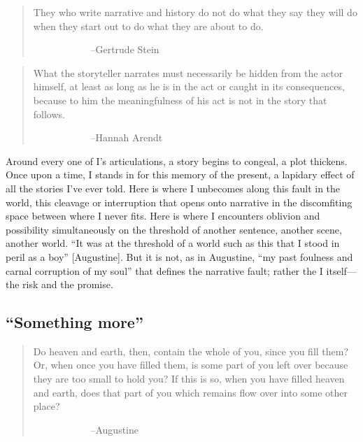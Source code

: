\documentclass[
]{memoir}
\begin{document}
\begin{quote}
They who write narrative and history do not do what they say they will
do when they start out to do what they are about to do.

~~~~~~~~~~ ~--Gertrude Stein
\end{quote}

\begin{quote}
What the storyteller narrates must necessarily be hidden from the actor
himself, at least as long as he is in the act or caught in its
consequences, because to him the meaningfulness of his act is not in the
story that follows.

~~~~~~~~~~ ~--Hannah Arendt
\end{quote}

Around every one of I's articulations, a story begins to congeal, a plot
thickens. Once upon a time, I stands in for this memory of the present,
a lapidary effect of all the stories I've ever told. Here is where I
unbecomes along this fault in the world, this cleavage or interruption
that opens onto narrative in the discomfiting space between where I
never fits. Here is where I encounters oblivion and possibility
simultaneously on the threshold of another sentence, another scene,
another world. ``It was at the threshold of a world such as this that I
stood in peril as a boy'' {[}Augustine{]}. But it is not, as in
Augustine, ``my past foulness and carnal corruption of my soul'' that
defines the narrative fault; rather the I itself---the risk and the
promise.

\hypertarget{something-more}{%
\subsection*{``Something more''}\label{something-more}}

\begin{quote}
Do heaven and earth, then, contain the whole of you, since you fill
them? Or, when once you have filled them, is some part of you left over
because they are too small to hold you? If this is so, when you have
filled heaven and earth, does that part of you which remains flow over
into some other place?

~~~~~~~~~~ ~--Augustine
\end{quote}
\end{document}

